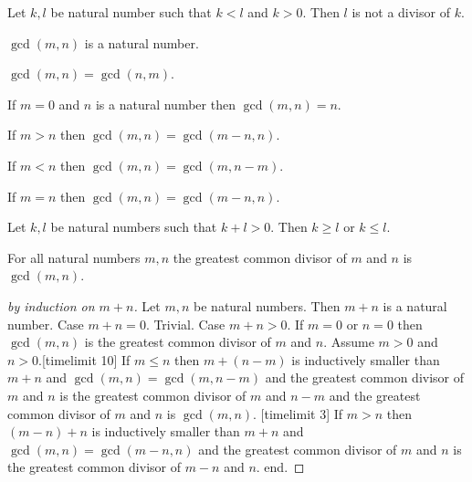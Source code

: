 \documentclass{article}
\begin{document}
\begin{forthel}
\begin{proposition}
Let $k,l$ be natural number such that $k < l$ and $k > 0$.
Then $l$ is not a divisor of $k$.
\end{proposition}



\begin{signature}
$\gcd(m,n)$ is a natural number.
\end{signature}

\begin{axiom}
$\gcd(m,n) = \gcd(n,m)$.
\end{axiom}

\begin{axiom}
If $m=0$ and $n$ is a natural number then $\gcd(m,n)=n$.
\end{axiom}
\begin{axiom}
If $m > n$ then $\gcd(m,n) = \gcd(m-n,n)$.
\end{axiom}
\begin{axiom}
If $m < n$ then $\gcd(m,n) = \gcd(m,n-m)$.
\end{axiom}
\begin{axiom}
If $m = n$ then $\gcd(m,n) = \gcd(m-n,n)$.
\end{axiom}

\begin{lemma}
Let $k,l$ be natural numbers such that $k + l >0$. 
Then $k \geq l$ or $k \leq l$.
\end{lemma}


\begin{proposition}
For all natural numbers $m,n$ the greatest common divisor of $m$ and $n$ is $\gcd(m,n)$.
\end{proposition}
\begin{proof}[by induction on $m+n$]
Let $m,n$ be natural numbers.
Then $m+n$ is a natural number.
Case $m + n =0$. Trivial.
Case $m + n > 0$.
If $m=0$ or $n=0$ then $\gcd(m,n)$ is 
the greatest common divisor of $m$ and $n$.
Assume $m>0$ and $n>0$.[timelimit 10]
If $m \leq n$ then $m + (n-m)$ is inductively smaller than $m + n$ and
$\gcd(m,n) = \gcd(m,n-m)$ and
the greatest common divisor of $m$ and $n$ is 
the greatest common divisor of $m$ and $n-m$
and the greatest common divisor of $m$ and $n$ is $\gcd(m,n)$. [timelimit 3]
If $m > n$ then $(m-n) + n$ is inductively smaller than $m + n$ and
$\gcd(m,n) = \gcd(m-n,n)$ and 
the greatest common divisor of $m$ and $n$ is 
the greatest common divisor of $m-n$ and $n$. end.
\end{proof}
\end{forthel}
\end{document}
